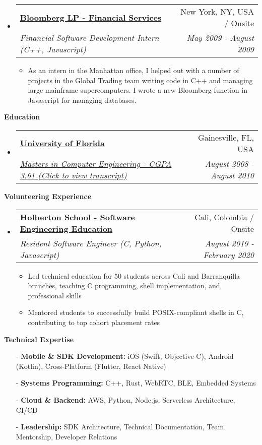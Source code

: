 \documentclass[letterpaper,11pt]{article}
\makeatletter
\newcommand{\resitem}[1]{\item #1 \vspace{-2pt}}
\newcommand{\resheading}[1]{{\large \colorbox{mygrey}{\begin{minipage}{\textwidth}{\textbf{#1 \vphantom{p\^{E}}}}\end{minipage}}}}
\newcommand{\ressubheading}[4]{
\begin{tabular*}{7.0in}{l@{\extracolsep{\fill}}r}
    \textbf{#1} & #2 \\
    \textit{#3} & \textit{#4} \\
\end{tabular*}\vspace{-6pt}}
\makeatother
\begin{document}
\begin{itemize}
\item
    \ressubheading{\href{http://www.bloomberg.com}{Bloomberg LP - Financial Services}}{New York, NY, USA / Onsite}{Financial Software Development Intern (C++, Javascript)}{May 2009 - August 2009}
    \begin{itemize}
      \resitem{As an intern in the Manhattan office, I helped out with a number of projects in the Global Trading team writing code in C++ and managing large mainframe supercomputers. I wrote a new Bloomberg function in Javascript for managing databases.}
    \end{itemize}
    
    
\end{itemize}

\vspace{0.2in}
  
\resheading{Education}
\begin{itemize}
\item
    \ressubheading{\href{https://bit.ly/4a2uloZ}{University of Florida}}{Gainesville, FL, USA}{\href{https://bit.ly/4a2uloZ}{Masters in Computer Engineering - CGPA 3.61 (Click to view transcript)}}{August 2008 - August 2010}
    \end{itemize}

\vspace{0.2in}

\resheading{Volunteering Experience}
\begin{itemize}
\item
    \ressubheading{\href{https://www.holbertonschool.com/}{Holberton School - Software Engineering Education}}{Cali, Colombia / Onsite}{Resident Software Engineer (C, Python, Javascript)}{August 2019 - February 2020}
    \begin{itemize}
        \resitem{Led technical education for 50 students across Cali and Barranquilla branches, teaching C programming, shell implementation, and professional skills}
        \resitem{Mentored students to successfully build POSIX-compliant shells in C, contributing to top cohort placement rates}
    \end{itemize}
\end{itemize}

\resheading{Technical Expertise}
\begin{itemize}
    \item[-] \textbf{Mobile \& SDK Development:} iOS (Swift, Objective-C), Android (Kotlin), Cross-Platform (Flutter, React Native)
    \item[-] \textbf{Systems Programming:} C++, Rust, WebRTC, BLE, Embedded Systems
    \item[-] \textbf{Cloud \& Backend:} AWS, Python, Node.js, Serverless Architecture, CI/CD
    \item[-] \textbf{Leadership:} SDK Architecture, Technical Documentation, Team Mentorship, Developer Relations
\end{itemize}
\end{document}
